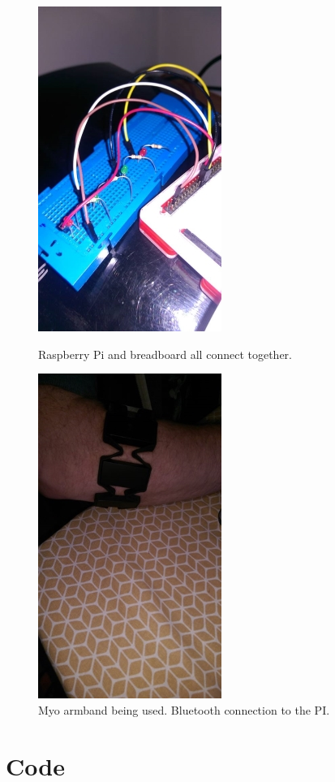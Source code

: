 \documentclass[12pt,a4paper,oneside,openany]{book}
\begin{document}
\begin{figure}[!b]
	\begin{minipage}[b]{0.47\textwidth}
		\includegraphics{raspberry.jpg}
		\caption{Raspberry Pi and breadboard all connect together.}
	\end{minipage}
	\hfill
	\begin{minipage}[b]{0.47\textwidth}
		\includegraphics{myo.jpg}
		\caption{Myo armband being used. Bluetooth connection to the PI.}
	\end{minipage}
\end{figure}

\chapter*{Code}
\end{document}
